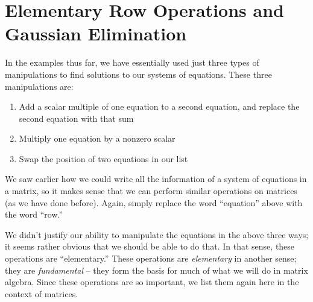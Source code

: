 \section{Elementary Row Operations and Gaussian Elimination}\label{sec:gaussian_elimination}


In the examples thus far, we have essentially used just three types of manipulations to find solutions to our systems of equations. These three manipulations are:

\begin{enumerate}
\item		Add a scalar multiple of one equation to a second equation, and replace the second equation with that sum
\item		Multiply one equation by a nonzero scalar
\item		Swap the position of two equations in our list
\end{enumerate}

We saw earlier how we could write all the information of a system of equations in a matrix, so it makes sense that we can perform similar operations on matrices (as we have done before). Again, simply replace the word ``equation'' above with the word ``row.'' 

We didn't justify our ability to manipulate the equations in the above three ways; it seems rather obvious that we should be able to do that. In that sense, these operations are ``elementary.'' These operations are \textit{elementary} in another sense; they are \textit{fundamental} -- they form the basis for much of what we will do in matrix algebra. Since these operations are so important, we list them again here in the context of matrices.

